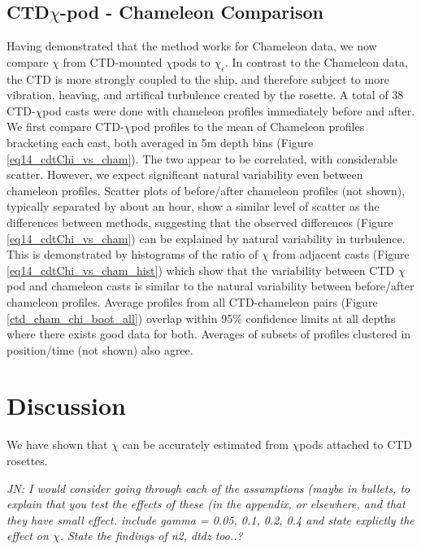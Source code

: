 \documentclass{ametsoc}
\begin{document}
\subsection{CTD$\chi$-pod - Chameleon Comparison}

Having demonstrated that the method works for Chameleon data, we now compare $\chi$ from CTD-mounted $\chi$pods to $\chi_{\epsilon}$. In contrast to the Chameleon data, the CTD is more strongly coupled to the ship, and therefore subject to more vibration, heaving, and artifical turbulence created by the rosette. A total of 38 CTD-$\chi$pod casts were done with chameleon profiles immediately before and after. We first compare CTD-$\chi$pod profiles to the mean of Chameleon profiles bracketing each cast, both averaged in 5m depth bins (Figure \ref{eq14_cdtChi_vs_cham}). The two appear to be correlated, with considerable scatter. However, we expect significant natural variability even between chameleon profiles. Scatter plots of before/after chameleon profiles (not shown), typically separated by about an hour, show a similar level of scatter as the differences between methods, suggesting that the observed differences (Figure \ref{eq14_cdtChi_vs_cham}) can be explained by natural variability in turbulence. This is demonstrated by histograms of the ratio of $\chi$ from adjacent casts (Figure \ref{eq14_cdtChi_vs_cham_hist}) which show that the variability between CTD $\chi$pod and chameleon casts is similar to the natural variability between before/after chameleon profiles. Average profiles from all CTD-chameleon pairs (Figure \ref{ctd_cham_chi_boot_all}) overlap within 95\% confidence limits at all depths where there exists good data for both. Averages of subsets of profiles clustered in position/time (not shown) also agree. 


\section{Discussion}

We have shown that $\chi$ can be accurately estimated from $\chi$pods attached to CTD rosettes.

{\em JN: I would consider going through each of the assumptions (maybe in bullets, to explain that you test the effects of these (in the appendix, or elsewhere, and that they have small effect.  include gamma = 0.05, 0.1, 0.2, 0.4 and state explictly the effect on $\chi$.  State the findings of n2, dtdz too..? }
\end{document}
